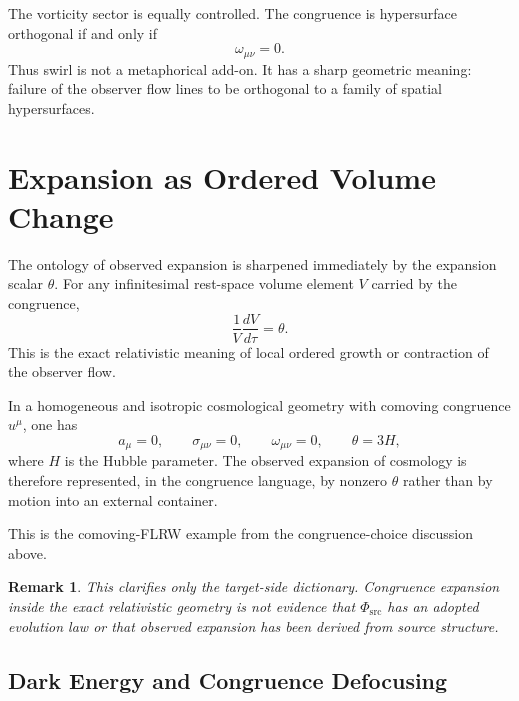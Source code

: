 \documentclass[11pt]{article}
\newcommand{\PhiSrc}{\Phi_{\mathrm{src}}}
\newtheorem{remark}{Remark}
\begin{document}
The vorticity sector is equally controlled. The congruence is hypersurface orthogonal if and only if
\begin{equation}
\omega_{\mu\nu}=0.
\label{eq:frobenius}
\end{equation}
Thus swirl is not a metaphorical add-on. It has a sharp geometric meaning: failure of the observer flow lines to be orthogonal to a family of spatial hypersurfaces.

\section{Expansion as Ordered Volume Change}

The ontology of observed expansion is sharpened immediately by the expansion scalar \(\theta\). For any infinitesimal rest-space volume element \(V\) carried by the congruence,
\begin{equation}
\frac{1}{V}\frac{dV}{d\tau}=\theta.
\label{eq:volumeexpansion}
\end{equation}
This is the exact relativistic meaning of local ordered growth or contraction of the observer flow.

In a homogeneous and isotropic cosmological geometry with comoving congruence \(u^\mu\), one has
\begin{equation}
a_\mu=0,
\qquad
\sigma_{\mu\nu}=0,
\qquad
\omega_{\mu\nu}=0,
\qquad
\theta = 3H,
\label{eq:flrwtheta}
\end{equation}
where \(H\) is the Hubble parameter. The observed expansion of cosmology is therefore represented, in the congruence language, by nonzero \(\theta\) rather than by motion into an external container.

This is the comoving-FLRW example from the congruence-choice discussion above.

\begin{remark}
This clarifies only the target-side dictionary. Congruence expansion inside
the exact relativistic geometry is not evidence that \(\PhiSrc\) has an
adopted evolution law or that observed expansion has been derived from source
structure.
\end{remark}

\subsection{Dark Energy and Congruence Defocusing}
\end{document}
